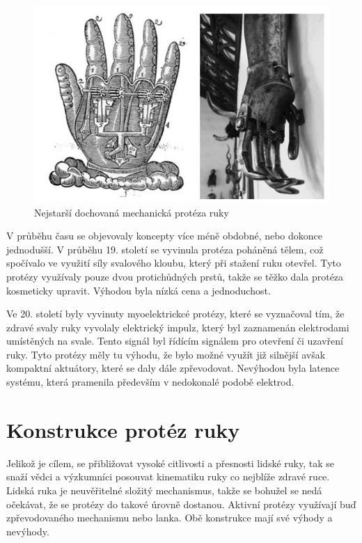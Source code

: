 \documentclass[a4paper,12pt]{article}
\begin{document}
 
\begin{figure}[b!]
\centering
\includegraphics[scale=0.6]{figures/Historic_hand_prosthesis.PNG}
\caption{Nejstarší dochovaná mechanická protéza ruky \cite{Chappell}}
\end{figure}\break
V průběhu času se objevovaly koncepty více méně obdobné, nebo dokonce jednodušší. V průběhu 19. století se vyvinula protéza poháněná tělem, což spočívalo ve využití síly svalového kloubu, který při stažení ruku otevřel. Tyto protézy využívaly pouze dvou protichůdných prstů, takže se těžko dala protéza kosmeticky upravit. Výhodou byla nízká cena a jednoduchost.\cite{Fukushima}

Ve 20. století byly vyvinuty myoelektrickcé protézy, které se vyznačoval tím, že zdravé svaly ruky vyvolaly elektrický impulz, který byl zaznamenán elektrodami umístěných na svale. Tento signál byl řídícím signálem pro otevření či uzavření ruky. Tyto protézy měly tu výhodu, že bylo možné využít již silnější avšak kompaktní aktuátory, které se daly dále zpřevodovat. Nevýhodou byla latence systému, která pramenila především v nedokonalé podobě elektrod.\cite{Fukushima}\par

\section{Konstrukce protéz ruky}
Jelikož je cílem, se přibližovat vysoké citlivosti a přesnosti lidské ruky, tak se snaží vědci a výzkumníci posouvat kinematiku ruky co nejblíže zdravé ruce. Lidská ruka je neuvěřitelné složitý mechanismus, takže se bohužel se nedá očekávat, že se protézy do takové úrovně dostanou. Aktivní protézy využívají buď zpřevodovaného mechanismu nebo lanka. Obě konstrukce mají své výhody a nevýhody.\cite{Chappell}\par
\end{document}
